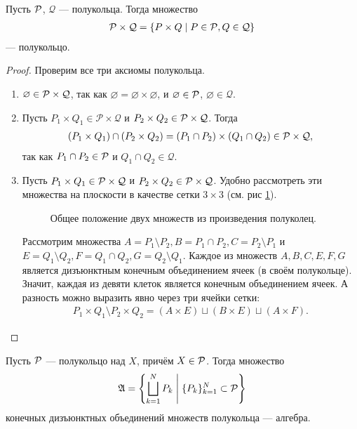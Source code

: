 \begin{lm}
 \label{lemma:product_of_semirings_is_semiring}
 Пусть  $\mathcal{P}$, $\mathcal{Q}$ --- полукольца. Тогда множество \begin{align*}
  \mathcal{P} \times \mathcal{Q} = \left\{ P \times Q \;\middle|\; P \in \mathcal{P}, Q \in \mathcal{Q} \right\}
 \end{align*}  --- полукольцо.
\end{lm}
\begin{proof}
 Проверим все три аксиомы полукольца.
 \begin{enumerate}
  \item $\varnothing \in \mathcal{P} \times \mathcal{Q}$, так как $\varnothing = \varnothing \times \varnothing$, и $\varnothing \in \mathcal{P}$, $\varnothing \in \mathcal{Q}$.
  \item Пусть $P_1 \times Q_1 \in \mathcal{P} \times \mathcal{Q}$ и  $P_2 \times Q_2 \in \mathcal{P} \times \mathcal{Q}$. Тогда \begin{align*}
    (P_1 \times Q_1) \cap (P_2 \times Q_2) = (P_1 \cap P_2) \times (Q_1 \cap Q_2) \in \mathcal{P} \times \mathcal{Q}
   ,\end{align*} так как $P_1 \cap P_2 \in \mathcal{P}$ и $Q_1 \cap Q_2 \in \mathcal{Q}$.
  \item Пусть $P_1 \times Q_1 \in \mathcal{P} \times \mathcal{Q}$ и $P_2 \times Q_2 \in \mathcal{P} \times \mathcal{Q}$. Удобно рассмотреть эти множества на плоскости в качестве сетки $3 \times 3$ (см. рис \ref{fig:semiring-product-set-difference}).
   \begin{figure}[ht]
    \centering
    \caption{Общее положение двух множеств из произведения полуколец.}
    \label{fig:semiring-product-set-difference}
   \end{figure}
   Рассмотрим множества $A = P_1 \setminus P_2, B = P_1 \cap P_2, C = P_2 \setminus P_1$ и $E = Q_1 \setminus Q_2, F = Q_1 \cap Q_2, G = Q_2 \setminus Q_1$. Каждое из множеств $A, B, C, E, F, G$ является дизъюнктным конечным объединением ячеек (в своём полукольце). Значит, каждая из девяти клеток является конечным объединением ячеек. А разность можно выразить явно через три ячейки сетки: \begin{align*}
    P_1 \times Q_1 \setminus P_2 \times Q_2 = (A \times E) \sqcup (B \times E) \sqcup (A \times F)
   .\end{align*}
 \end{enumerate}
\end{proof}
\begin{lm}
 \label{lemma:semiring_to_algebra}
 Пусть $\mathcal{P}$ --- полукольцо над $X$, причём $X \in \mathcal{P}$. Тогда множество \begin{align*}
  \mathfrak{A} = \left\{ \bigsqcup_{k=1}^{N} P_k \;\middle|\; \{P_{k}\}_{k=1}^{N} \subset \mathcal{P}  \right\}
 \end{align*} конечных дизъюнктных объединений множеств полукольца  --- алгебра.
\end{lm}
